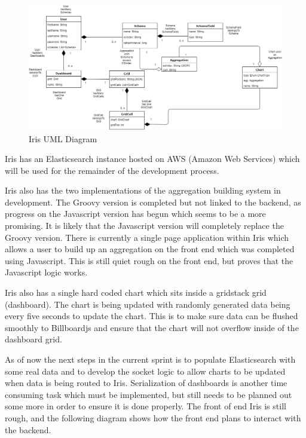 \documentclass[12pt,a4paper,titlepage]{report}
\begin{document}
\begin{figure}[h]
\begin{tcolorbox}
\includegraphics[width=\textwidth]{iris_models}
\end{tcolorbox}
\caption{Iris UML Diagram}\label{fig:iris_uml}
\end{figure}


Iris has an Elasticsearch instance hosted on AWS (Amazon Web Services) which will be used for the remainder of the development process.

Iris also has the two implementations of the aggregation building system in development. The Groovy version is completed but not linked to the backend, as progress on the Javascript version has begun which seems to be a more promising. It is likely that the Javascript version will completely replace the Groovy version. There is currently a single page application within Iris which allows a user to build up an aggregation on the front end which was completed using Javascript. This is still quiet rough on the front end, but proves that the Javascript logic works.

Iris also has a single hard coded chart which sits inside a gridstack grid (dashboard). The chart is being updated with randomly generated data being every five seconds to update the chart. This is to make sure data can be flushed smoothly to Billboardjs and ensure that the chart will not overflow inside of the dashboard grid.

As of now the next steps in the current sprint is to populate Elasticsearch with some real data and to develop the socket logic to allow charts to be updated when data is being routed to Iris. Serialization of dashboards is another time consuming task which must be implemented, but still needs to be planned out some more in order to ensure it is done properly. The front of end Iris is still rough, and the following diagram shows how the front end plans to interact with the backend.
\end{document}
